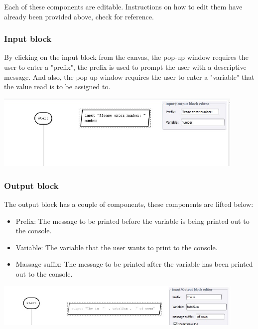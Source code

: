 \documentclass[11pt,a4paper,titlepage]{article}
\begin{document}
	Each of these components are editable. Instructions on how to edit them have already been provided above, check for reference.\newline
	
	\subsubsection{Input block}
	
	By clicking on the input block from the canvas, the pop-up window requires the user to enter a "prefix", the prefix is used to prompt the user with a descriptive message. And also, the pop-up window requires the user to enter a "variable" that the value read is to be assigned to. \newline \newline
	
	\includegraphics[width=12cm]{images/editInput.jpg} \newline
	
	\subsubsection{Output block}
	
	The output block has a couple of components, these components are lifted below:
	\begin{itemize}
	\item Prefix: \newline
	The message to be printed before the variable is being printed out to the console.
	\item Variable: \newline
	The variable that the user wants to print to the console.
	\item Massage suffix: \newline
	The message to be printed after the variable has been printed out to the console. \newline
	\end{itemize}
		
	\includegraphics[width=12cm]{images/editOutput.jpg} \newline
	
\end{document}
